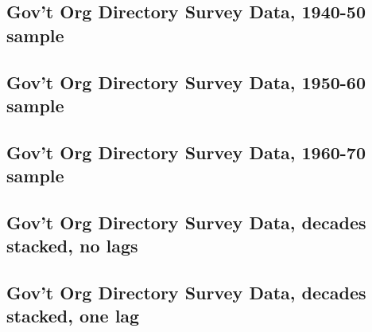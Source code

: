 \documentclass{article}
\begin{document}
{{		\subsection{Gov't Org Directory Survey Data, 1940-50 sample}
		
		
		
		
		\clearpage
		
		\subsection{Gov't Org Directory Survey Data, 1950-60 sample}
		
		
		
		
		\clearpage
		
		\subsection{Gov't Org Directory Survey Data, 1960-70 sample}
		
		
		
		
		\clearpage
		
		\subsection{Gov't Org Directory Survey Data, decades stacked, no lags}
		
		
		
		
		\clearpage
		
		\subsection{Gov't Org Directory Survey Data, decades stacked, one lag}
		
		
		
		
		\clearpage
		
}}
\end{document}
